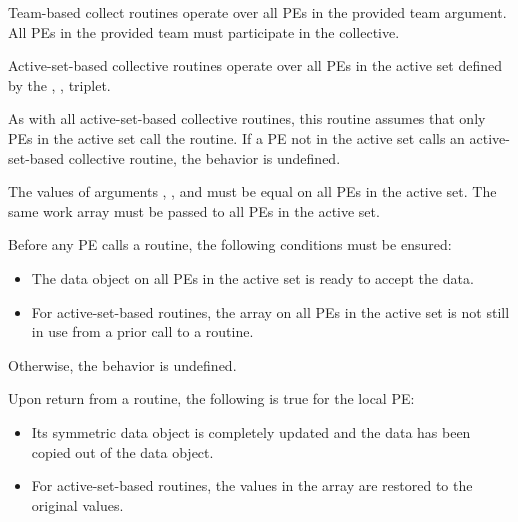 \begin{apidefinition}
{    Team-based collect routines operate over all \acp{PE} in the provided team
    argument. All \acp{PE} in the provided team must participate in the collective.

    Active-set-based collective routines operate over all \acp{PE} in the active set
    defined by the , ,  triplet.

    As with all active-set-based collective routines,
    this routine assumes that only \acp{PE} in the active set call the routine.
    If a \ac{PE} not in the active set calls an
    active-set-based collective routine,
    the behavior is undefined.

    The values of arguments , ,
    and  must be equal on all \acp{PE} in the active set. The same
     work
    array must be passed to all \acp{PE} in the active set.

    Before any \ac{PE} calls a  routine,
    the following conditions must be ensured:
    \begin{itemize}
    \item The  data object on all \acp{PE} in the active set is
      ready to accept the  data.
    \item For active-set-based routines, the  array
    on all \acp{PE} in the active set is not still in use from a prior call
    to a  routine.
    \end{itemize}
    Otherwise, the behavior is undefined.

    Upon return from a  routine, the following is true for
    the local PE:
    \begin{itemize}
    \item Its  symmetric data object is completely updated and
    the data has been copied out of the  data object.
    \item For active-set-based routines,
    the values in the  array are restored to the original values.
    \end{itemize}
}



\end{apidefinition}
